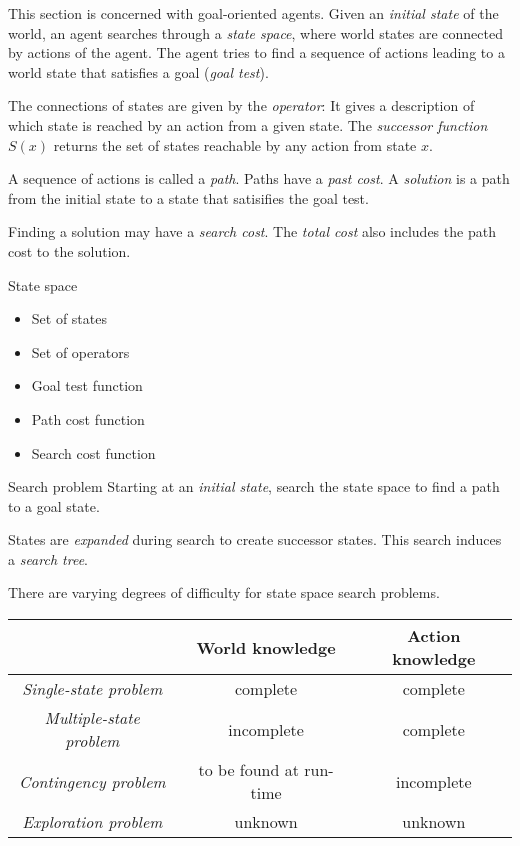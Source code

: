 \documentclass[english]{panikzettel}
\begin{document}
\begin{halfboxl}
This section is concerned with goal-oriented agents.
Given an \emph{initial state} of the world, an agent searches through a \emph{state space}, where world states are connected by actions of the agent.
The agent tries to find a sequence of actions leading to a world state that satisfies a goal (\emph{goal test}).

The connections of states are given by the \emph{operator}: It gives a description of which state is reached by an action from a given state. The \emph{successor function} $S(x)$ returns the set of states reachable by any action from state $x$.

A sequence of actions is called a \emph{path}.
Paths have a \emph{past cost}.
A \emph{solution} is a path from the initial state to a state that satisifies the goal test.

Finding a solution may have a \emph{search cost}.
The \emph{total cost} also includes the path cost to the solution.
\end{halfboxl}%
\begin{halfboxr}
\vspace{-\baselineskip}
\begin{defi}{State space}
\begin{itemize}
    \item Set of states
    \item Set of operators
    \item Goal test function
    \item Path cost function
    \item Search cost function
\end{itemize}
\end{defi}

\begin{defi}{Search problem}
Starting at an \emph{initial state}, search the state space to find a path to a goal state.

States are \emph{expanded} during search to create successor states.
This search induces a \emph{search tree}.
\end{defi}
\end{halfboxr}

There are varying degrees of difficulty for state space search problems.
\begin{center}
    \begin{tabular}{c|c|c}
        & World knowledge & Action knowledge \\ \hline
        \emph{Single-state problem} & complete & complete \\
        \emph{Multiple-state problem} & incomplete & complete \\
        \emph{Contingency problem} & to be found at run-time & incomplete \\
        \emph{Exploration problem} & unknown & unknown
    \end{tabular}
\end{center}
\end{document}

